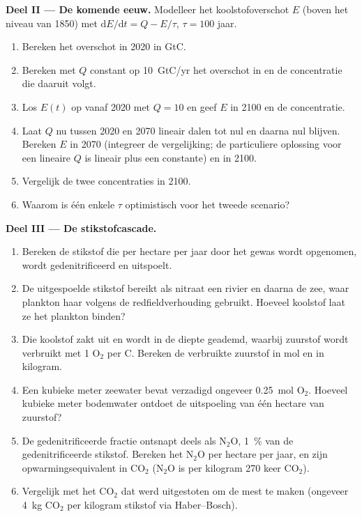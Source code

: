 \begin{problem}
\medskip
\noindent\textbf{Deel II --- De komende eeuw.}
Modelleer het koolstofoverschot $E$ (boven het niveau van 1850) met
$\mathrm{d}E/\mathrm{d}t = Q - E/\tau$, $\tau = 100$ jaar.
\begin{enumerate}[resume]
  \item Bereken het overschot in 2020 in GtC.
  \item Bereken met $Q$ constant op \qty{10}{GtC/yr} het overschot in
         en de concentratie die daaruit volgt.
  \item Los $E(t)$ op vanaf 2020 met $Q = 10$ en geef $E$ in
        2100 en de concentratie.
  \item Laat $Q$ nu tussen 2020 en 2070 lineair dalen tot nul en daarna
        nul blijven. Bereken $E$ in 2070 (integreer de vergelijking;
        de particuliere oplossing voor een lineaire $Q$ is lineair plus een
        constante) en in 2100.
  \item Vergelijk de twee concentraties in 2100.
  \item Waarom is één enkele $\tau$ optimistisch voor het tweede scenario?
\end{enumerate}

\medskip
\noindent\textbf{Deel III --- De stikstofcascade.}
\begin{enumerate}[resume]
  \item Bereken de stikstof die per hectare per jaar door het gewas wordt
        opgenomen, wordt gedenitrificeerd en uitspoelt.
  \item De uitgespoelde stikstof bereikt als nitraat een rivier en daarna de
        zee, waar plankton haar volgens de redfieldverhouding gebruikt. Hoeveel
        koolstof laat ze het plankton binden?
  \item Die koolstof zakt uit en wordt in de diepte geademd, waarbij
        zuurstof wordt verbruikt met 1 $\mathrm{O_2}$ per C. Bereken de verbruikte
        zuurstof in mol en in kilogram.
  \item Een kubieke meter zeewater bevat verzadigd ongeveer \qty{0.25}{mol}
        $\mathrm{O_2}$. Hoeveel kubieke meter bodemwater
        ontdoet de uitspoeling van één hectare van zuurstof?
  \item De gedenitrificeerde fractie ontsnapt deels als $\mathrm{N_2O}$,
        \qty{1}{\%} van de gedenitrificeerde stikstof. Bereken het $\mathrm{N_2O}$
        per hectare per jaar, en zijn opwarmingsequivalent in $\mathrm{CO_2}$
        ($\mathrm{N_2O}$ is per kilogram 270 keer $\mathrm{CO_2}$).
  \item Vergelijk met het $\mathrm{CO_2}$ dat werd uitgestoten om de mest te maken
        (ongeveer \qty{4}{kg} $\mathrm{CO_2}$ per kilogram stikstof via
        Haber--Bosch).
\end{enumerate}


\end{problem}
